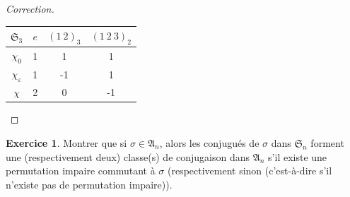 \documentclass[french]{book}
\theoremstyle{definition}
\newtheorem{exo}{Exercice}
\begin{document}
\begin{proof}[Correction]
\begin{enumerate}
\begin{enumerate}
      \begin{center}
        \begin{tabular}{|c|c|c|c|}
          \hline
          \(\mathfrak{S}_{3}\) & \(e\) & \((1 \ 2) _{3}\) & \((1 \ 2 \ 3) _{2}\) \\
          \hline
          \(\chi_0\) & 1 & 1 & 1 \\
          \hline
          \(\chi _{\varepsilon}\) & 1 & -1 & 1 \\
          \hline
          \(\chi\) & 2 & 0 & -1 \\
          \hline
        \end{tabular}
      \end{center}
    \end{enumerate}
  \end{enumerate}
\end{proof}

\begin{exo}
  Montrer que si \(\sigma \in \mathfrak{A}_n\), alors les conjugués de \(\sigma\) dans \(\mathfrak{S}_n\) forment une (respectivement deux) classe(s) de conjugaison dans \(\mathfrak{A}_n\) s'il existe une permutation impaire commutant à \(\sigma\) (respectivement sinon (c'est-à-dire s'il n'existe pas de permutation impaire)).
\end{exo}
\end{document}

